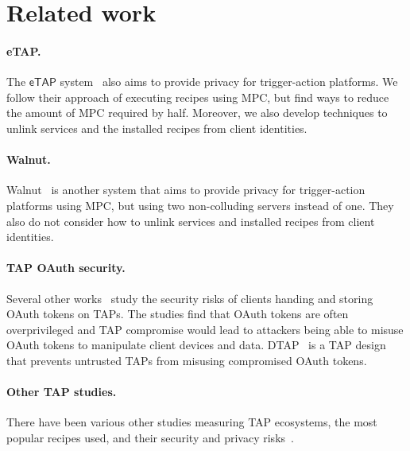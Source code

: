 \section{Related work}
\label{sec:related}

\paragraph{eTAP.}
The $\mathsf{eTAP}$ system~\cite{DBLP:conf/sp/ChenCWSCF21} also aims to provide
privacy for trigger-action platforms. We follow their approach of executing
recipes using MPC, but find ways to reduce the amount of MPC required by
half. Moreover, we also develop techniques to unlink services and the installed
recipes from client identities.

\paragraph{Walnut.}
Walnut~\cite{DBLP:journals/corr/abs-2009-12447} is another system that aims to
provide privacy for trigger-action platforms using MPC, but using two
non-colluding servers instead of one. They also do not consider how to unlink
services and installed recipes from client identities.

\paragraph{TAP OAuth security.}
Several other
works~\cite{DBLP:journals/corr/FernandesRJP17,DBLP:conf/ndss/FernandesRJP18}
study the security risks of clients handing and storing OAuth tokens on
TAPs. The studies find that OAuth tokens are often overprivileged and TAP
compromise would lead to attackers being able to misuse OAuth tokens to
manipulate client devices and data. DTAP~\cite{DBLP:conf/ndss/FernandesRJP18} is
a TAP design that prevents untrusted TAPs from misusing compromised OAuth tokens.

\paragraph{Other TAP studies.}
There have been various other studies measuring TAP ecosystems, the most popular
recipes used, and their security and privacy
risks~\cite{DBLP:conf/sp/ChenCWSCF21,DBLP:conf/chi/UrHBLMPSL16,DBLP:conf/www/SurbatovichABDJ17,
  DBLP:conf/imc/MiQZW17,DBLP:journals/corr/abs-2110-00068}.

